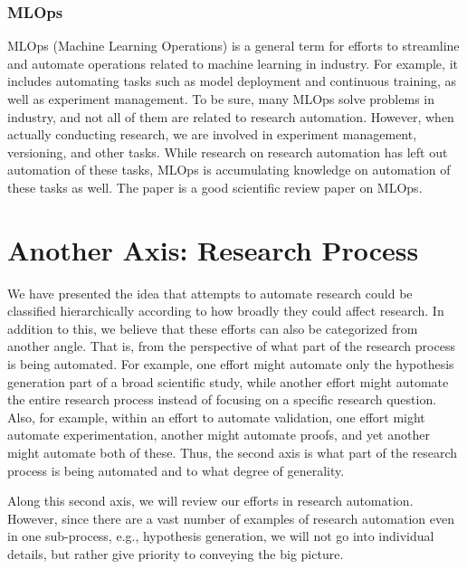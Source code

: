 \subsubsection{MLOps}
MLOps (Machine Learning Operations) is a general term for efforts to streamline and automate operations related to machine learning in industry. For example, it includes automating tasks such as model deployment and continuous training, as well as experiment management. To be sure, many MLOps solve problems in industry, and not all of them are related to research automation. However, when actually conducting research, we are involved in experiment management, versioning, and other tasks. While research on research automation has left out automation of these tasks, MLOps is accumulating knowledge on automation of these tasks as well.  The paper \cite{kreuzberger2023machine} is a good scientific review paper on MLOps.



\section{Another Axis: Research Process}
We have presented the idea that attempts to automate research could be classified hierarchically according to how broadly they could affect research. In addition to this, we believe that these efforts can also be categorized from another angle. That is, from the perspective of what part of the research process is being automated. For example, one effort might automate only the hypothesis generation part of a broad scientific study, while another effort might automate the entire research process instead of focusing on a specific research question. Also, for example, within an effort to automate validation, one effort might automate experimentation, another might automate proofs, and yet another might automate both of these. Thus, the second axis is what part of the research process is being automated and to what degree of generality.

Along this second axis, we will review our efforts in research automation. However, since there are a vast number of examples of research automation even in one sub-process, e.g., hypothesis generation, we will not go into individual details, but rather give priority to conveying the big picture.


